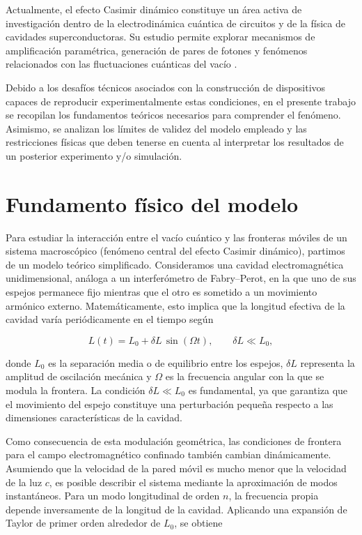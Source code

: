 \documentclass[11pt,a4paper]{article}
\begin{document}
Actualmente, el efecto Casimir dinámico constituye un área activa de investigación dentro de la electrodinámica cuántica de circuitos y de la física de cavidades superconductoras. Su estudio permite explorar mecanismos de amplificación paramétrica, generación de pares de fotones y fenómenos relacionados con las fluctuaciones cuánticas del vacío \cite{nation2012}.

Debido a los desafíos técnicos asociados con la construcción de dispositivos capaces de reproducir experimentalmente estas condiciones, en el presente trabajo se recopilan los fundamentos teóricos necesarios para comprender el fenómeno. Asimismo, se analizan los límites de validez del modelo empleado y las restricciones físicas que deben tenerse en cuenta al interpretar los resultados de un posterior experimento y/o simulación.

\section{Fundamento físico del modelo}

Para estudiar la interacción entre el vacío cuántico y las fronteras móviles de un sistema macroscópico (fenómeno central del efecto Casimir dinámico), partimos de un modelo teórico simplificado. Consideramos una cavidad electromagnética unidimensional, análoga a un interferómetro de Fabry--Perot, en la que uno de sus espejos permanece fijo mientras que el otro es sometido a un movimiento armónico externo. Matemáticamente, esto implica que la longitud efectiva de la cavidad varía periódicamente en el tiempo según

\begin{equation}
L(t)=L_0+\delta L\,\sin(\Omega t),
\qquad
\delta L \ll L_0,
\end{equation}

donde $L_0$ es la separación media o de equilibrio entre los espejos, $\delta L$ representa la amplitud de oscilación mecánica y $\Omega$ es la frecuencia angular con la que se modula la frontera. La condición $\delta L \ll L_0$ es fundamental, ya que garantiza que el movimiento del espejo constituye una perturbación pequeña respecto a las dimensiones características de la cavidad.

Como consecuencia de esta modulación geométrica, las condiciones de frontera para el campo electromagnético confinado también cambian dinámicamente. Asumiendo que la velocidad de la pared móvil es mucho menor que la velocidad de la luz $c$, es posible describir el sistema mediante la aproximación de modos instantáneos. Para un modo longitudinal de orden $n$, la frecuencia propia depende inversamente de la longitud de la cavidad. Aplicando una expansión de Taylor de primer orden alrededor de $L_0$, se obtiene
\end{document}
